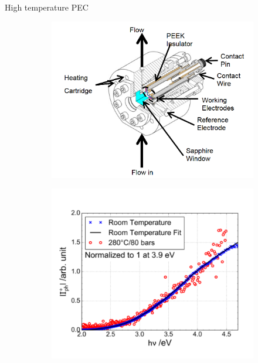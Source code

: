 \documentclass[10pt,compress]{beamer}
\newcommand{\coef}{1}
\begin{document}
\begin{frame}[allowframebreaks=1.0]{High temperature PEC}
\begin{figure}[h]
            \label{fig_bojinov_ht}
        \end{figure}

        \renewcommand{\coef}{0.45}
        \begin{figure}[h]
            \centering
            \begin{subfigure}{\coef\textwidth}
                \centering
                \includegraphics[width=\textwidth]{./src/figures/skocic2015-1.png}
                \caption{}
                \label{fig_skocic_phd_cell}
            \end{subfigure}
            \begin{subfigure}{\coef\textwidth}
                \centering
                \includegraphics[width=\textwidth]{./src/figures/skocic2015-2.png}
                \caption{}
                \label{fig_skocic_phd_htpec}
            \end{subfigure}
            

\end{figure}
\end{frame}
\end{document}
